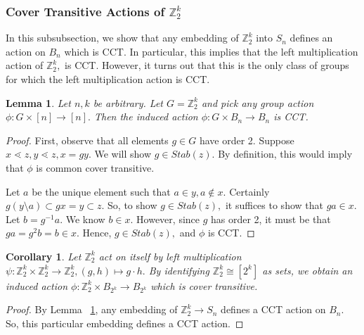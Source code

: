 \documentclass[10 pt]{amsart}
\theoremstyle{plain}
\newtheorem{lem}[thm]{Lemma}
\newtheorem{cor}[thm]{Corollary}
\theoremstyle{definition}
\theoremstyle{remark}
\numberwithin{equation}{section}
\newcommand\sssec{\subsubsection}
\newcommand\BBZ{{\mathbb Z}}
\newcommand\BZ{{\mathbb Z}}
\begin{document}
\sssec{Cover Transitive Actions of $\BZ_2^k$}

In this subsubsection, we show that any embedding of $\BBZ_2^k$ into $S_n$ defines an action on $B_n$ which is CCT. In particular, this implies that the left multiplication action of $\BBZ_2^k,$ is CCT. However, it turns out that this is the only class of groups for which the left multiplication action is CCT.

\begin{lem}
\label{lem:order_2_CCT}
Let $n,k$ be arbitrary. Let $G = \BBZ_2^k$ and pick any group action $\phi:G\times [n] \rightarrow [n].$ Then the induced action $\phi:G \times B_n \rightarrow B_n$ is CCT.
\end{lem}
\begin{proof}
First, observe that all elements $g \in G$ have order 2. Suppose $x \lessdot z, y \lessdot z, x = gy.$ We will show $g \in Stab(z).$ By definition, this would imply that $\phi$ is common cover transitive. 

Let $a$ be the unique element such that $a \in y, a \notin x.$ Certainly $g(y\setminus a) \subset gx=y \subset z.$ So, to show $g \in Stab(z),$ it suffices to show that $ga \in x.$ Let $b = g^{-1}a.$ We know $b \in x.$ However, since $g$ has order 2, it must be that $ga = g^2 b = b \in x.$ Hence, $g \in Stab(z),$ and $\phi$ is CCT.
\end{proof}

\begin{cor}
\label{cor:regular_order_2_CCT}
Let $\BBZ_2^k$ act on itself by left multiplication $\psi:\BBZ_2^k \times \BBZ_2^k \rightarrow \BBZ_2^k,(g,h) \mapsto g\cdot h.$ By identifying $\BBZ_2^k \cong [2^k]$ as sets, we obtain an induced action $\phi:\BBZ_2^k \times B_{2^k} \rightarrow B_{2^k}$ which is cover transitive.
\end{cor}
\begin{proof}
By Lemma ~\ref{lem:order_2_CCT}, any embedding of $\BBZ_2^k \rightarrow S_n$ defines a CCT action on $B_n.$ So, this particular embedding defines a CCT action.
\end{proof}
\end{document}
